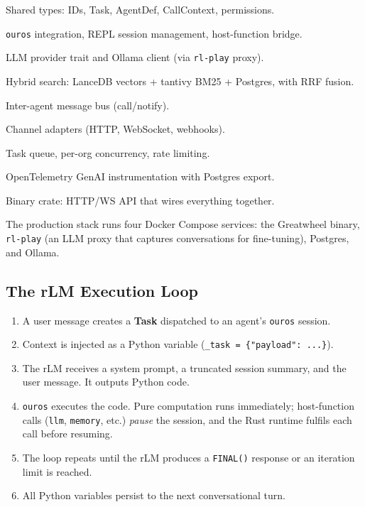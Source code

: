 \documentclass[11pt,a4paper]{article}
\begin{document}
\begin{description}[style=nextline, labelwidth=2.5cm, leftmargin=3cm]
  \item[\texttt{gw-core}] Shared types: IDs, Task, AgentDef, CallContext, permissions.
  \item[\texttt{gw-runtime}] \texttt{ouros} integration, REPL session management, host-function bridge.
  \item[\texttt{gw-llm}] LLM provider trait and Ollama client (via \texttt{rl-play} proxy).
  \item[\texttt{gw-memory}] Hybrid search: LanceDB vectors + tantivy BM25 + Postgres, with RRF fusion.
  \item[\texttt{gw-bus}] Inter-agent message bus (call/notify).
  \item[\texttt{gw-channels}] Channel adapters (HTTP, WebSocket, webhooks).
  \item[\texttt{gw-scheduler}] Task queue, per-org concurrency, rate limiting.
  \item[\texttt{gw-trace}] OpenTelemetry GenAI instrumentation with Postgres export.
  \item[\texttt{gw-server}] Binary crate: HTTP/WS API that wires everything together.
\end{description}

\noindent
The production stack runs four Docker Compose services: the Greatwheel binary,
\texttt{rl-play} (an LLM proxy that captures conversations for fine-tuning),
Postgres, and Ollama.

\subsection{The rLM Execution Loop}

\begin{enumerate}
  \item A user message creates a \textbf{Task} dispatched to an agent's
        \texttt{ouros} session.
  \item Context is injected as a Python variable
        (\texttt{\_task = \{"payload": ...\}}).
  \item The rLM receives a system prompt, a truncated session summary, and the
        user message. It outputs Python code.
  \item \texttt{ouros} executes the code. Pure computation runs immediately;
        host-function calls (\texttt{llm}, \texttt{memory}, etc.) \emph{pause}
        the session, and the Rust runtime fulfils each call before resuming.
  \item The loop repeats until the rLM produces a \texttt{FINAL()} response or
        an iteration limit is reached.
  \item All Python variables persist to the next conversational turn.
\end{enumerate}
\end{document}
